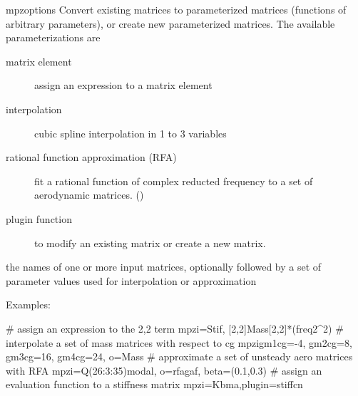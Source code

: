 
\begin{cmdref}{mpz}{options}
Convert existing matrices to parameterized matrices (functions of
arbitrary parameters), or create new parameterized matrices.
The available parameterizations are
\begin{description}
	\item[matrix element] assign an expression to a matrix element
	\item[interpolation] cubic spline interpolation in 1 to 3 variables
	\item[rational function approximation (RFA)] fit a rational function
		of complex reducted frequency to a set of aerodynamic matrices.
		()
	\item[plugin function] to modify an existing matrix or create a
		new matrix.
\end{description}

\begin{subopts}
		{the names of one or more input matrices, optionally followed by
		a set of parameter values used for interpolation or approximation}
	 
		 
\end{subopts}

Examples:
\begin{example}
# assign an expression to the 2,2 term
mpz{i=Stif, [2,2]{Mass[2,2]*(freq2^2)}}
# interpolate a set of mass matrices with respect to cg
mpz{i{gm1{cg=-4}, gm2{cg=8}, gm3{cg=16}, gm4{cg=24}}, o=Mass}
# approximate a set of unsteady aero matrices with RFA
mpz{i=Q(26:3:35)modal, o=rfagaf, beta=(0.1,0.3)}
# assign an evaluation function to a stiffness matrix
mpz{i=Kbma,plugin=stiffcn}
\end{example}

\end{cmdref}


